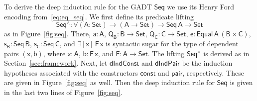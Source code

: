 \documentclass[sigplan,screen]{acmart}
\begin{document}
To derive the deep induction rule for the GADT $\mathsf{Seq}$ we use
its Henry Ford encoding from~\eqref{eq:eq_seq}.  We first define its
predicate lifting
\[\mathsf{Seq^\wedge : \forall (A : Set) \to (A \to
  Set) \to Seq\,A \to Set}\] as in Figure~\ref{fig:seq}. There,
$\mathsf{a : A}$, $\mathsf{Q_B : B \to Set}$, $\mathsf{Q_C : C \to
  Set}$, $\mathsf{e : Equal\,A\,(B \times C)}$, $\mathsf{s_B :
  Seq\,B}$, $\mathsf{s_C : Seq\,C}$, and $\mathsf{\exists [x]\, F
  \,x}$ is syntactic sugar for the type of dependent pairs
$\mathsf{(x,b)}$, where $\mathsf{x : A}$, $\mathsf{b : F\, x}$, and
$\mathsf{F : A \to Set}$.  The lifting $\mathsf{Seq^\wedge}$ is
derived as in Section~\ref{sec:framework}. Next, let
$\mathsf{dIndConst}$ and $\mathsf{dIndPair}$ be the induction
hypotheses associated with the constructors $\mathsf{const}$ and
$\mathsf{pair}$, respectively. These are given in Figure~\ref{fig:seq}
as well. Then the deep induction rule for $\mathsf{Seq}$ is given in
the last two lines of Figure~\ref{fig:seq}.
\end{document}
